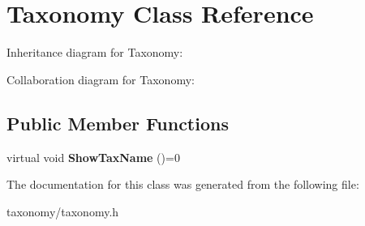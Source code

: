 \hypertarget{classTaxonomy}{}\section{Taxonomy Class Reference}
\label{classTaxonomy}


Inheritance diagram for Taxonomy\+:


Collaboration diagram for Taxonomy\+:
\subsection*{Public Member Functions}
\begin{DoxyCompactItemize}
\item 
virtual void {\bfseries Show\+Tax\+Name} ()=0\hypertarget{classTaxonomy_af7f09d651e5eed4f20ca2d63f550ecb5}{}\label{classTaxonomy_af7f09d651e5eed4f20ca2d63f550ecb5}

\end{DoxyCompactItemize}


The documentation for this class was generated from the following file\+:\begin{DoxyCompactItemize}
\item 
taxonomy/taxonomy.\+h\end{DoxyCompactItemize}
